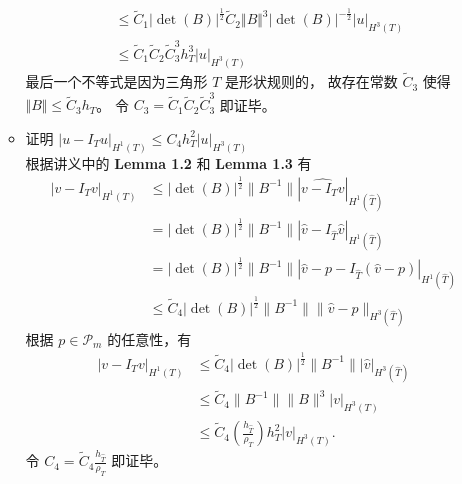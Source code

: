 \documentclass[a4paper]{article}
\begin{document}
\begin{enumerate}
\begin{itemize}
\begin{equation}
\begin{aligned}
                                &\leq \tilde{C}_1 |\det(B)|^{\frac{1}{2}} \tilde{C}_2 \Vert B\Vert^3 |\det(B)|^{-\frac{1}{2}}|u|_{H^3(T)}\\
                                &\leq \tilde{C}_1 \tilde{C}_2 \tilde{C}_3^3 h_T^3 |u|_{H^3(T)}
                            \end{aligned}
                        \end{equation}
                        最后一个不等式是因为三角形 $T$ 是形状规则的，
                        故存在常数 $\tilde{C}_3$ 使得 $\Vert B\Vert \leq \tilde{C}_3 h_T$。
                        令 $C_3 = \tilde{C}_1 \tilde{C}_2 \tilde{C}_3^3$ 即证毕。
                        \item 证明 $|u-I_T u|_{H^1(T)} \leq C_4 h^2_T |u|_{H^3(T)}$\\
                            根据讲义中的 \textbf{Lemma 1.2} 和 \textbf{Lemma 1.3} 有
                            \begin{equation}
                                \begin{aligned}
                                        |v-I_{T}v|_{H^{1}(T)}
                                        & \leq|\det (B)|^{\frac{1}{2}}\|B^{-1}\||\widehat{v-I_{T}v}|_{H^{1}(\widehat{T})} \\
                                        & =|\det (B)|^{\frac{1}{2}}\|B^{-1}\||\hat{v}-I_{\widehat{T}}\hat{v}|_{H^1(\widehat{T})} \\
                                        & =|\det (B)|^{\frac{1}{2}}\|B^{-1}\||\hat{v}-p-I_{\widehat{T}}(\hat{v}-p)|_{H^1(\widehat{T})} \\
                                        & \leq \tilde{C}_4|\det (B)|^{\frac{1}{2}}\|B^{-1}\|\|\hat{v}-p\|_{H^{3}(\widehat{T})}
                                \end{aligned}
                            \end{equation}
                            根据 $p\in\mathcal{P}_m$ 的任意性，有
                            \begin{equation}
                                \begin{aligned}
                                |v-I_{T}v|_{H^{1}(T)} 
                                & \leq \tilde{C}_4|\det (B)|^{\frac{1}{2}}\|B^{-1}\||\hat{v}|_{H^{3}(\widehat{T})} \\
                                & \leq \tilde{C}_4\|B^{-1}\|\|B\|^{3}|v|_{H^{3}(T)} \\
                                & \leq \tilde{C}_4\left(\frac{h_{\widehat{T}}}{\rho_T}\right)h_{T}^{2}|v|_{H^{3}(T)}.
                                \end{aligned}
                            \end{equation}
                            令 $C_4 = \tilde{C}_4 \frac{h_{\hat{T}}}{\rho_T}$ 即证毕。
                \end{itemize}
\end{enumerate}
\end{document}
